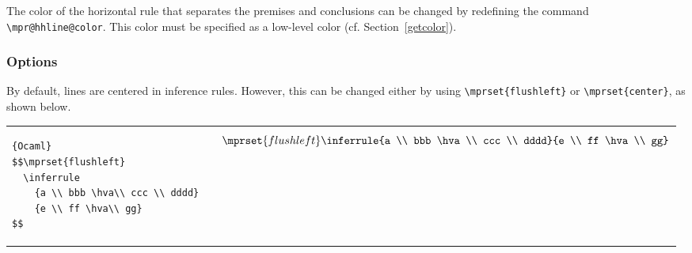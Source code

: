 The color of the horizontal rule that separates the premises and
conclusions can be changed by redefining the command
\verb+\mpr@hhline@color+. This color must be specified as a low-level
color (cf. Section~\ref{getcolor}).


\subsubsection{Options}

By default, lines are centered in inference rules. However, this can be changed either by using \verb"\mprset{flushleft}" or \verb"\mprset{center}", as shown below. 
\begin{center}
\begin{tabular}{m{0.40\hsize}m{0.12\hsize}m{0.40\hsize}}
\begin{lstlisting}[basicstyle=\tt]{Ocaml}
$$\mprset{flushleft}
  \inferrule 
    {a \\ bbb \hva\\ ccc \\ dddd}
    {e \\ ff \hva\\ gg}
$$ 
\end{lstlisting}
&
\qquad\qquad
&
$$\mprset{flushleft} 
\inferrule {a \\ bbb  \hva\\ ccc \\ dddd}{e \\ ff \hva\\ gg}$$
\\
\end{tabular}  
\end{center}

